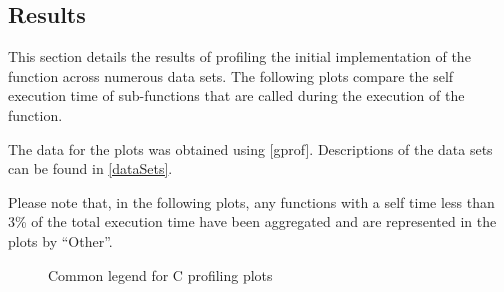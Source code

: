 
\subsection{Results}
\label{software:algorithmProfiling:c:results}
This section details the results of profiling the initial 
implementation of the  function across
numerous data sets. The following plots compare the self execution time of
sub-functions that are called during the execution of the
 function.

The data for the plots was obtained using [gprof].
Descriptions of the data sets can be found in \autoref{dataSets}.

Please note that, in the following plots, any functions with a self time less
than 3\% of the total execution time have been aggregated and are represented in
the plots by ``Other''.


\begin{figure}
    
    \caption{Common legend for C profiling plots}
    \label{profiling:c:legend}
\end{figure}
